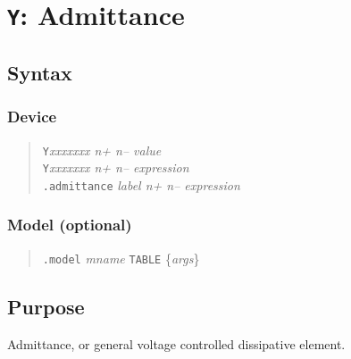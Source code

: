 %
%
%
%
\section{{\tt Y}: Admittance}
\subsection{Syntax}
\subsubsection{Device}
\begin{verse}
{\tt Y}{\it xxxxxxx n+ n-- value}\\
{\tt Y}{\it xxxxxxx n+ n-- expression}\\
{\tt .admittance} {\it label n+ n-- expression}
\end{verse}
\subsubsection{Model (optional)}
\begin{verse}
{\tt .model} {\it mname} {\tt TABLE} \{{\it args}\}
\end{verse}
\subsection{Purpose}

Admittance, or general voltage controlled dissipative element.

